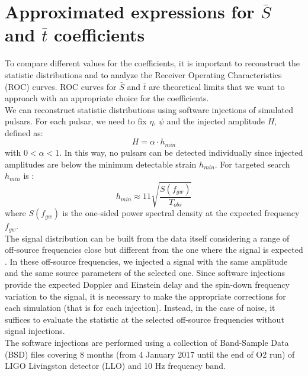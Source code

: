 \documentclass[11pt,a4paper,final]{iopart}
\begin{document}
\section{Approximated expressions for $\bar{S}$ and $\bar{t}$ coefficients}\label{4}
To compare different values for the coefficients, it is important to reconstruct the statistic distributions and to analyze the Receiver Operating Characteristics (ROC) curves. ROC curves for  $\bar{S}$ and $\bar{t}$ are theoretical limits that we want to approach with an appropriate choice for the coefficients.
\\We can reconstruct statistic distributions using software injections of simulated pulsars. For each pulsar, we need to fix $\eta$, $\psi$  and the injected amplitude $H$, defined as:
\begin{equation}\label{injamp}
H=\alpha \cdot h_{min}
\end{equation} with $0<\alpha<1$. In this way, no pulsars can be detected individually since injected amplitudes are below the minimum detectable strain $h_{min}$.  For targeted search $h_{min}$ is \cite{jjj}:
\begin{equation}
\label{hminimo}
h_{min}\approx 11 \sqrt{\frac{S(f_{gw})}{T_{obs}}} 
\end{equation}
 where $S(f_{gw})$ is the one-sided power spectral density at the expected frequency $f_{gw}$.
\\The signal distribution can be built from the data itself considering a range of off-source frequencies close but different from the one where the signal is expected \cite{2014}. In these off-source frequencies, we injected a signal with the same amplitude and the same source parameters of the selected one. Since software injections provide the expected Doppler and Einstein delay and the spin-down frequency variation to the signal, it is necessary to make the appropriate corrections for each simulation (that is for each injection). 
Instead, in the case of noise, it suffices to evaluate the statistic at the selected off-source frequencies without signal injections.
\\The software injections are performed using a collection of Band-Sample Data (BSD) files \cite{2019} covering 8 months (from 4 January 2017 until the end of O2 run) of LIGO Livingston detector (LLO) and 10 Hz frequency band. 
\end{document}
